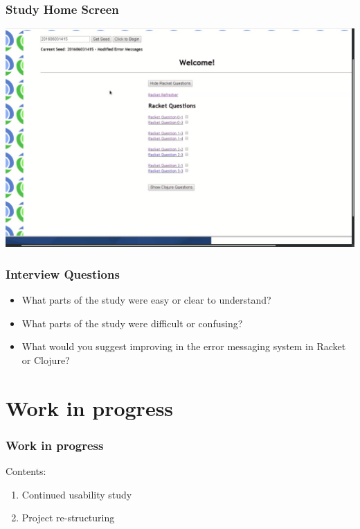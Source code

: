 \documentclass{beamer}
\begin{document}
\begin{frame}
  \frametitle{Study Home Screen}
  \includegraphics[scale=.17]{StudyHomeScreen}
\end{frame}

\begin{frame}
  \frametitle{Interview Questions}
 \begin{itemize}
 
\item What parts of the study were easy or clear to understand?
\item What parts of the study were difficult or confusing?
\item What would you suggest improving in the error messaging system in Racket or Clojure? 
 
 \end{itemize}
\end{frame}  



\section{Work in progress}

\begin{frame}
  \frametitle{Work in progress}
Contents:
\begin{enumerate}
\item Continued usability study 
\item Project re-structuring
\end{enumerate}
\end{frame}
\end{document}
